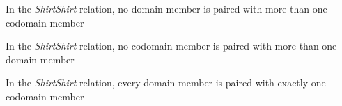 \documentclass{ximera}
\begin{document}
\begin{exercise}
\begin{question} 
In the \textit{ShirtShirt} relation, no domain member is paired with more than one codomain member

\begin{multipleChoice}
\end{multipleChoice}
\end{question}








\begin{question} 
In the \textit{ShirtShirt} relation, no codomain member is paired with more than one domain member

\begin{multipleChoice}
\end{multipleChoice}
\end{question}








\begin{question} 
In the \textit{ShirtShirt} relation, every domain member is paired with exactly one codomain member

\begin{multipleChoice}
\end{multipleChoice}
\end{question}







\end{exercise}
\end{document}
